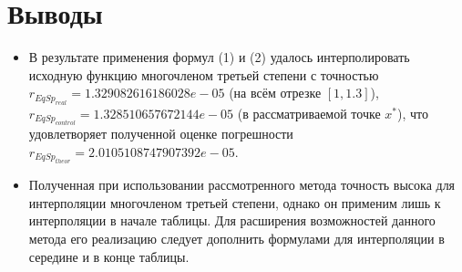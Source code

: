 \documentclass[14pt, a4paper]{article}
\begin{document}
  \section{Выводы}
  \begin{itemize}
  \item
  В результате применения формул (1) и (2) удалось интерполировать исходную функцию многочленом третьей степени с точностью $r_{EqSp_{real}} = 1.329082616186028e-05$ (на всём отрезке $[1, 1.3]$), $r_{EqSp_{control}} = 1.328510657672144e-05$ (в рассматриваемой точке $x^*$), что удовлетворяет полученной оценке погрешности $r_{EqSp_{theor}} = 2.0105108747907392e-05$.
  \item
  Полученная при использовании рассмотренного метода точность высока для интерполяции многочленом третьей степени, однако он применим лишь к интерполяции в начале таблицы. Для расширения возможностей данного метода его реализацию следует дополнить формулами для интерполяции в середине и в конце таблицы.
  \end{itemize}
\end{document}
